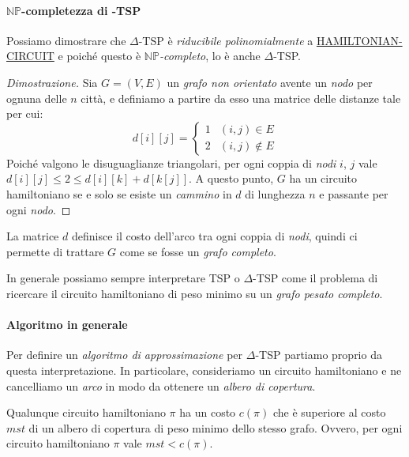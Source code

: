 \paragraph{$\mathbb{NP}$-completezza di \bm{$\Delta$}-TSP}
Possiamo dimostrare che $\Delta$-TSP è \emph{riducibile polinomialmente} a
\hyperref[prob:35]{HAMILTONIAN-CIRCUIT} e poiché questo è
\emph{$\mathbb{NP}$-completo}, lo è anche $\Delta$-TSP.

\begin{proof}[Dimostrazione]
    Sia $G=(V,E)$ un \emph{grafo non orientato} avente un \emph{nodo} per ognuna
    delle $n$ città, e definiamo a partire da esso una matrice delle distanze
    tale per cui:
    \[d[i][j]=\begin{cases}
        1 & (i,j)\in E\\
        2 & (i,j)\notin E
    \end{cases}\]
    Poiché valgono le disuguaglianze triangolari, per ogni coppia di \emph{nodi}
    $i$, $j$ vale $d[i][j]\leq 2\leq d[i][k]+d[k[j]]$. A questo punto, $G$ ha
    un circuito hamiltoniano se e solo se esiste un \emph{cammino} in $d$ di
    lunghezza $n$ e passante per ogni \emph{nodo}.
\end{proof}
\begin{note}
    La matrice $d$ definisce il costo dell'arco tra ogni coppia di \emph{nodi},
    quindi ci permette di trattare $G$ come se fosse un \emph{grafo completo}.
\end{note}

\noindent
In generale possiamo sempre interpretare TSP o $\Delta$-TSP come il problema di
ricercare il circuito hamiltoniano di peso minimo su un \emph{grafo pesato
completo}.

\paragraph{Algoritmo in generale}
Per definire un \emph{algoritmo di approssimazione} per $\Delta$-TSP
partiamo proprio da questa interpretazione. In particolare, consideriamo un
circuito hamiltoniano e ne cancelliamo un \emph{arco} in modo da ottenere un
\emph{albero di copertura}.

\begin{definition}
    Qualunque circuito hamiltoniano $\pi$ ha un costo $c(\pi)$ che è superiore
    al costo $mst$ di un albero di copertura di peso minimo dello stesso grafo.
    Ovvero, per ogni circuito hamiltoniano $\pi$ vale $mst<c(\pi)$.
\end{definition}

